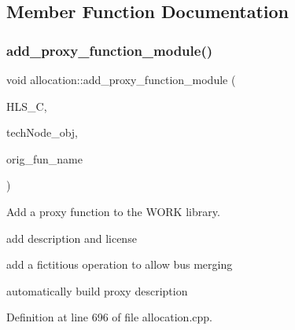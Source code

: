 \subsection{Member Function Documentation}
\mbox{\label{classallocation_a4084c75f1c138f51b8b7f3c609d45d01}} 
\subsubsection{\texorpdfstring{add\+\_\+proxy\+\_\+function\+\_\+module()}{add\_proxy\_function\_module()}}
{\footnotesize\ttfamily void allocation\+::add\+\_\+proxy\+\_\+function\+\_\+module (\begin{DoxyParamCaption}\item[{const \hyperlink{hls__constraints_8hpp_ac394d1c5cd991614133724294a79182b}{H\+L\+S\+\_\+constraints\+Ref}}]{H\+L\+S\+\_\+C,  }\item[{\hyperlink{technology__node_8hpp_a33dd193b7bd6b987bf0d8a770a819fa7}{technology\+\_\+node\+Ref}}]{tech\+Node\+\_\+obj,  }\item[{const std\+::string \&}]{orig\+\_\+fun\+\_\+name }\end{DoxyParamCaption})\hspace{0.3cm}{\ttfamily [protected]}}



Add a proxy function to the W\+O\+RK library. 

add description and license

add a fictitious operation to allow bus merging

automatically build proxy description 

Definition at line 696 of file allocation.\+cpp.



